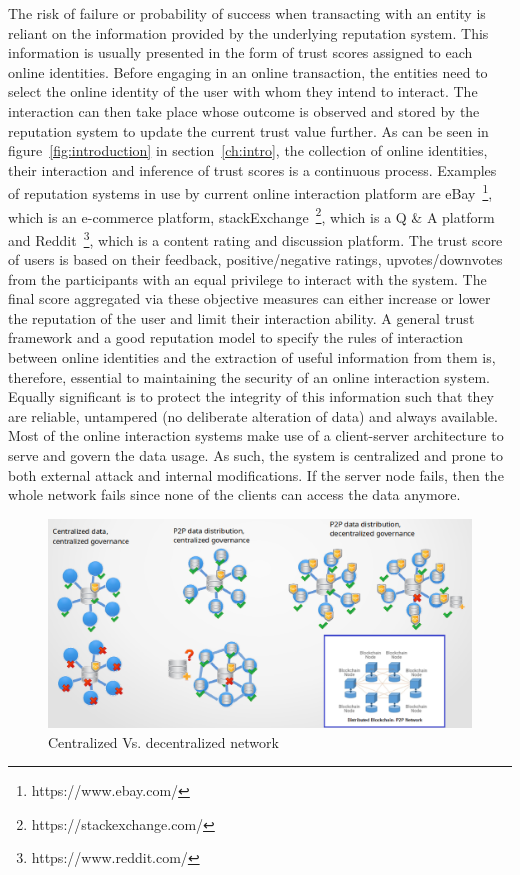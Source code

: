 The risk of failure or probability of success when transacting with an entity
is reliant on the information provided by the underlying reputation system.
This information is usually presented in the form of trust scores assigned to
each online identities. Before engaging in an online transaction, the entities
need to select the online identity of the user with whom they intend to
interact. The interaction can then take place whose outcome is observed and
stored by the reputation system to update the current trust value further. As
can be seen in figure~\ref{fig:introduction} in section~\ref{ch:intro}, the
collection of online identities, their interaction and inference of trust
scores is a continuous process. Examples of reputation systems in use by
current online interaction platform are eBay~\footnote{https://www.ebay.com/},
which is an e-commerce platform,
stackExchange~\footnote{https://stackexchange.com/}, which is a Q \& A platform
and Reddit~\footnote{https://www.reddit.com/}, which is a content rating and
discussion platform. The trust score of users is based on their feedback,
positive/negative ratings, upvotes/downvotes from the participants with an
equal privilege to interact with the system. The final score aggregated via
these objective measures can either increase or lower the reputation of the
user and limit their interaction ability. A general trust framework and a good
reputation model to specify the rules of interaction between online identities
and the extraction of useful information from them is, therefore, essential to
maintaining the security of an online interaction system. Equally significant
is to protect the integrity of this information such that they are reliable,
untampered (no deliberate alteration of data) and always available. Most of the
online interaction systems make use of a client-server architecture to serve
and govern the data usage. As such, the system is centralized and prone to both
external attack and internal modifications. If the server node fails, then the
whole network fails since none of the clients can access the data anymore. 
\begin{figure}
	\begin{center}
		\includegraphics[width=1.0\textwidth]{Images/WhyBlockchain.eps}
		\caption{Centralized Vs. decentralized network}
		\label{fig:WhyBlockchain}
	\end{center}
\end{figure}
